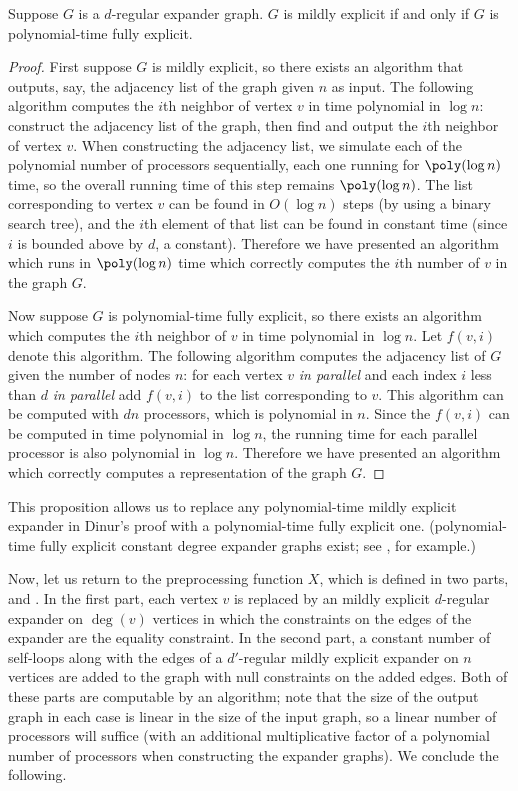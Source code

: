 \documentclass{article}
\begin{document}
\begin{proposition}
  Suppose $G$ is a $d$-regular expander graph.
  $G$ is \NC{} mildly explicit if and only if $G$ is polynomial-time fully explicit.
\end{proposition}
\begin{proof}
  First suppose $G$ is \NC{} mildly explicit, so there exists an \NC{} algorithm that outputs, say, the adjacency list of the graph given $n$ as input.
  The following algorithm computes the $i$th neighbor of vertex $v$ in time polynomial in $\log n$: construct the adjacency list of the graph, then find and output the $i$th neighbor of vertex $v$.
  When constructing the adjacency list, we simulate each of the polynomial number of processors sequentially, each one running for $\poly(\log n)$ time, so the overall running time of this step remains $\poly(\log n)$.
  The list corresponding to vertex $v$ can be found in $O(\log n)$ steps (by using a binary search tree), and the $i$th element of that list can be found in constant time (since $i$ is bounded above by $d$, a constant).
  Therefore we have presented an algorithm which runs in $\poly(\log n)$ time which correctly computes the $i$th number of $v$ in the graph $G$.

  Now suppose $G$ is polynomial-time fully explicit, so there exists an algorithm which computes the $i$th neighbor of $v$ in time polynomial in $\log n$.
  Let $f(v, i)$ denote this algorithm.
  The following \NC{} algorithm computes the adjacency list of $G$ given the number of nodes $n$: for each vertex $v$ \emph{in parallel} and each index $i$ less than $d$ \emph{in parallel} add $f(v, i)$ to the list corresponding to $v$.
  This algorithm can be computed with $dn$ processors, which is polynomial in $n$.
  Since the $f(v, i)$ can be computed in time polynomial in $\log n$, the running time for each parallel processor is also polynomial in $\log n$.
  Therefore we have presented an \NC{} algorithm which correctly computes a representation of the graph $G$.
\end{proof}

This proposition allows us to replace any polynomial-time mildly explicit expander in Dinur's proof with a polynomial-time fully explicit one.
(polynomial-time fully explicit constant degree expander graphs exist; see \autocite{rvw00}, for example.)

Now, let us return to the preprocessing function $X$, which is defined in two parts, \autocite[Definition~4.1]{dinur07} and \autocite[Definition~4.2]{dinur07}.
In the first part, each vertex $v$ is replaced by an \NC{} mildly explicit $d$-regular expander on $\deg(v)$ vertices in which the constraints on the edges of the expander are the equality constraint.
In the second part, a constant number of self-loops along with the edges of a $d'$-regular \NC{} mildly explicit expander on $n$ vertices are added to the graph with null constraints on the added edges.
Both of these parts are computable by an \NC{} algorithm; note that the size of the output graph in each case is linear in the size of the input graph, so a linear number of processors will suffice (with an additional multiplicative factor of a polynomial number of processors when constructing the expander graphs).
We conclude the following.
\end{document}
